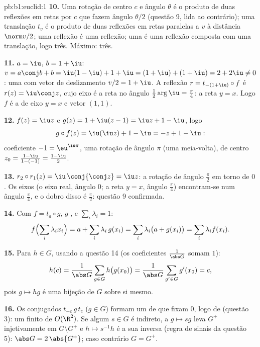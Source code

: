 \begin{solution}{pb:b1:euclid:1}
\textbf{10.} Uma rotação de centro $c$ e ângulo $\theta$ é o produto
de duas reflexões em retas por $c$ que fazem ângulo $\theta/2$ (questão
9, lida ao contrário); uma translação $t_v$ é o produto de duas
reflexões em retas paralelas  a $v$ à distância $\norm v/2$; uma
reflexão é uma reflexão; uma  é uma reflexão
composta com uma translação, logo três. Máximo: três.

\textbf{11.} $a = \iu$, $b = 1 + \iu$: $v = a\conj b + b =
\iu(1 - \iu) + 1 + \iu = (1 + \iu) + (1 + \iu) = 2 + 2\iu \neq
0$: uma  com
vetor de deslizamento $v/2 = 1 + \iu$. A reflexão $r = t_{-(1+\iu)}\circ f$ é $r(z) = \iu\conj z$, cujo eixo é a
reta no ângulo $\frac12\arg\iu = \frac\pi4$: a reta $y = x$. Logo $f$ é a  de eixo $y = x$ e vetor $(1, 1)$.

\textbf{12.} $f(z) = \iu z$ e $g(z) = 1 + \iu(z - 1) = \iu z
+ 1 - \iu$, logo
\[
g\circ f(z) = \iu(\iu z) + 1 - \iu = -z + 1 - \iu :
\]
coeficiente  $-1 = \eu^{\iu\pi}$, uma rotação de ângulo $\pi$ (uma
meia-volta), de centro $z_0 = \frac{1 - \iu}{1 - (-1)}
= \frac{1 - \iu}{2}$.

\textbf{13.} $r_2\circ r_1(z) = \iu\,\conj{\conj z} = \iu z$: a rotação de ângulo $\frac\pi2$ em torno de $0$. Os
eixos (o eixo real, ângulo $0$; a reta $y = x$, ângulo $\frac\pi4$)
encontram-se num ângulo $\frac\pi4$, e o dobro disso é $\frac\pi2$: questão 9
confirmada.

\textbf{14.} Com $f = t_a\circ g$, $g$ , e $\sum_i
\lambda_i = 1$:
\[
f\Bigl(\sum_i \lambda_i x_i\Bigr)
= a + \sum_i \lambda_i\,g(x_i)
= \sum_i \lambda_i\bigl(a + g(x_i)\bigr)
= \sum_i \lambda_i f(x_i) .
\]

\textbf{15.} Para $h \in G$, usando a questão 14 (os coeficientes
$\frac1{\abs G}$ somam $1$):
\[
h(c) = \frac{1}{\abs G}\sum_{g \in G} h\bigl(g(x_0)\bigr)
= \frac{1}{\abs G}\sum_{g' \in G} g'(x_0) = c ,
\]
pois $g \mapsto hg$ é uma bijeção de $G$ sobre si mesmo.

\textbf{16.} Os conjugados $t_{-c}\,g\,t_{c}$ ($g \in G$) formam um  de
 que fixam $0$, logo de  \emph{}
(questão 3): um  finito de $O(\R^2)$. Se algum $s \in G$ é
indireto, a  $g \mapsto sg$ leva $G^+$ injetivamente em $G\setminus G^+$ e
$h \mapsto s^{-1}h$ é a sua inversa (regra de sinais da questão 5): $\abs G = 2\,\abs{G^+}$; caso
contrário $G = G^+$.


\end{solution}
